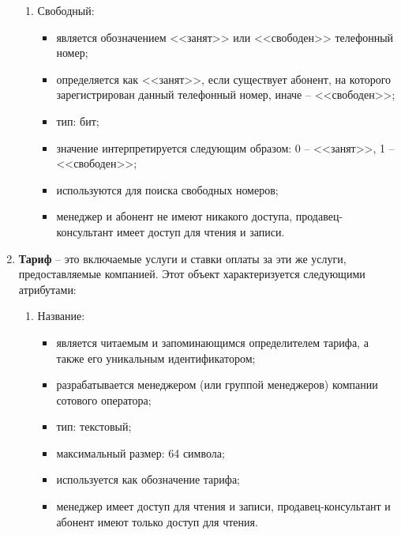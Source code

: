 \begin{enumerate}
\begin{enumerate}
        \item Свободный:
        \begin{itemize}
            \item является обозначением <<занят>> или <<свободен>> телефонный номер;
            \item определяется как <<занят>>, если существует абонент, на которого зарегистрирован данный телефонный номер, иначе -- <<свободен>>;
            \item тип: бит;
            \item значение интерпретируется следующим образом: 0 -- <<занят>>, 1 -- <<свободен>>;
            \item используются для поиска свободных номеров;
            \item менеджер и абонент не имеют никакого доступа, продавец-консультант имеет доступ для чтения и записи.
        \end{itemize}
    \end{enumerate}

    \item \textbf{Тариф} -- это включаемые услуги и ставки оплаты за эти же услуги, предоставляемые компанией. Этот объект характеризуется следующими атрибутами:
    \begin{enumerate}
        \item Название:
        \begin{itemize}
            \item является читаемым и запоминающимся определителем тарифа, а также его уникальным идентификатором;
            \item разрабатывается менеджером (или группой менеджеров) компании сотового оператора;
            \item тип: текстовый;
            \item максимальный размер: 64 символа;
            \item используется как обозначение тарифа;
            \item менеджер имеет доступ для чтения и записи, продавец-консультант и абонент имеют только доступ для чтения.
        \end{itemize}


\end{enumerate}
\end{enumerate}
